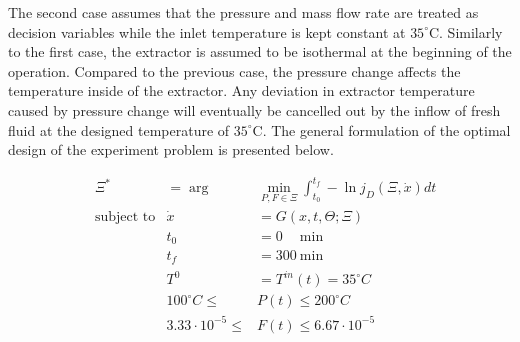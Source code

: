 \documentclass[../Article_Design_of_Experiment.tex]{subfiles}
\begin{document}
	The second case assumes that the pressure and mass flow rate are treated as decision variables while the inlet temperature is kept constant at $35^\circ$C. Similarly to the first case, the extractor is assumed to be isothermal at the beginning of the operation. Compared to the previous case, the pressure change affects the temperature inside of the extractor. Any deviation in extractor temperature caused by pressure change will eventually be cancelled out by the inflow of fresh fluid at the designed temperature of $35^\circ$C. The general formulation of the optimal design of the experiment problem is presented below.

	{\footnotesize
		\begin{equation}
			\begin{aligned} 
				&\Xi^* &= \arg &\min_{ P, F \in \Xi} \int_{t_0}^{t_f} - \ln j_D(\Xi,\dot{x}) dt  \\
				&\text{subject to}
				& \dot{x} &= G(x,t,\Theta;\Xi) \\
				&& t_0&=0\quad~\text{min} \\
				&& t_f&=300~\text{min} \\
				&& T^{0} &= T^{in}(t) = 35^\circ C \\
				&& 100^\circ C \leq &P(t) \leq 200^\circ C \\
				&& 3.33 \cdot 10^{-5} \leq &F(t) \leq 6.67 \cdot 10^{-5}
			\end{aligned} \label{EQ:Formulation_2}
	\end{equation} } 
		
\end{document}
